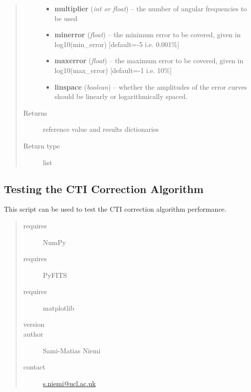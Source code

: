 \documentclass[a4paper,11pt,english]{sphinxmanual}
\begin{document}
\begin{fulllineitems}
\begin{quote}
\begin{description}
\begin{itemize}
\item {} 
\textbf{multiplier} (\emph{int or float}) -- the number of angular frequencies to be used

\item {} 
\textbf{minerror} (\emph{float}) -- the minimum error to be covered, given in log10(min\_error) {[}default=-5 i.e. 0.001\%{]}

\item {} 
\textbf{maxerror} (\emph{float}) -- the maximum error to be covered, given in log10(max\_error) {[}default=-1 i.e. 10\%{]}

\item {} 
\textbf{linspace} (\emph{boolean}) -- whether the amplitudes of the error curves should be linearly or logarithmically spaced.

\end{itemize}

\item[{Returns}] \leavevmode
reference value and results dictionaries

\item[{Return type}] \leavevmode
list

\end{description}\end{quote}

\end{fulllineitems}

\label{reduction:module-analysis.testCTIcorrection}

\subsection{Testing the CTI Correction Algorithm}
\label{reduction:testing-the-cti-correction-algorithm}
This script can be used to test the CTI correction algorithm performance.
\begin{quote}\begin{description}
\item[{requires}] \leavevmode
NumPy

\item[{requires}] \leavevmode
PyFITS

\item[{requires}] \leavevmode
matplotlib

\item[{version}] 

\item[{author}] \leavevmode
Sami-Matias Niemi

\item[{contact}] \leavevmode
\href{mailto:s.niemi@ucl.ac.uk}{s.niemi@ucl.ac.uk}

\end{description}\end{quote}
\end{document}
